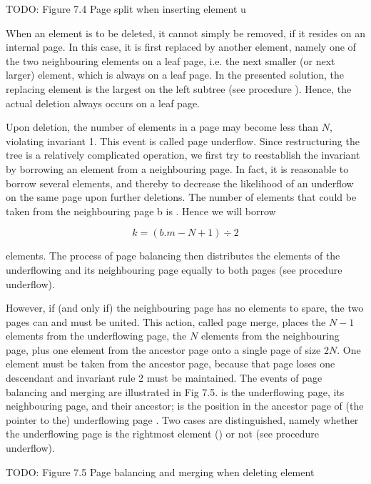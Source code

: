 TODO: Figure 7.4 Page split when inserting element u

When an element is to be deleted, it cannot simply be removed, if it resides on an internal page. In this case, it is first replaced by another element, namely one of the two neighbouring elements on a leaf page, i.e. the next smaller (or next larger) element, which is always on a leaf page. In the presented solution, the replacing element is the largest on the left subtree (see procedure ). Hence, the actual deletion always occurs on a leaf page.

Upon deletion, the number of elements in a page may become less than $N$, violating invariant 1. This event is called page underflow. Since restructuring the tree is a relatively complicated operation, we first try to reestablish the invariant by borrowing an element from a neighbouring page. In fact, it is reasonable to borrow several elements, and thereby to decrease the likelihood of an underflow on the same page upon further deletions. The number of elements that could be taken from the neighbouring page b is . Hence we will borrow

$$k = (b.m - N + 1) \div 2$$

elements. The process of page balancing then distributes the elements of the underflowing and its neighbouring page equally to both pages (see procedure underflow).

However, if (and only if) the neighbouring page has no elements to spare, the two pages can and must be united. This action, called page merge, places the $N-1$ elements from the underflowing page, the $N$ elements from the neighbouring page, plus one element from the ancestor page onto a single page of size $2N$. One element must be taken from the ancestor page, because that page loses one descendant and invariant rule 2 must be maintained. The events of page balancing and merging are illustrated in Fig 7.5.  is the underflowing page,  its neighbouring page, and  their ancestor;  is the position in the ancestor page of (the pointer to the) underflowing page . Two cases are distinguished, namely whether the underflowing page is the rightmost element () or not (see procedure underflow).

TODO: Figure 7.5 Page balancing and merging when deleting element


